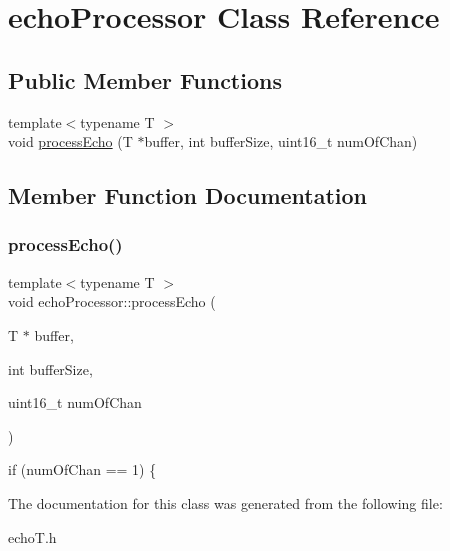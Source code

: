 \hypertarget{classechoProcessor}{}\section{echo\+Processor Class Reference}
\label{classechoProcessor}
\subsection*{Public Member Functions}
\begin{DoxyCompactItemize}
\item 
{\footnotesize template$<$typename T $>$ }\\void \hyperlink{classechoProcessor_a94a5b56b4f4285682a4a0f84b6741f3c}{process\+Echo} (T $\ast$buffer, int buffer\+Size, uint16\+\_\+t num\+Of\+Chan)
\end{DoxyCompactItemize}


\subsection{Member Function Documentation}
\mbox{\label{classechoProcessor_a94a5b56b4f4285682a4a0f84b6741f3c}} 
\subsubsection{\texorpdfstring{process\+Echo()}{processEcho()}}
{\footnotesize\ttfamily template$<$typename T $>$ \\
void echo\+Processor\+::process\+Echo (\begin{DoxyParamCaption}\item[{T $\ast$}]{buffer,  }\item[{int}]{buffer\+Size,  }\item[{uint16\+\_\+t}]{num\+Of\+Chan }\end{DoxyParamCaption})\hspace{0.3cm}{\ttfamily [inline]}}

if (num\+Of\+Chan == 1) \{ 

The documentation for this class was generated from the following file\+:\begin{DoxyCompactItemize}
\item 
echo\+T.\+h\end{DoxyCompactItemize}

